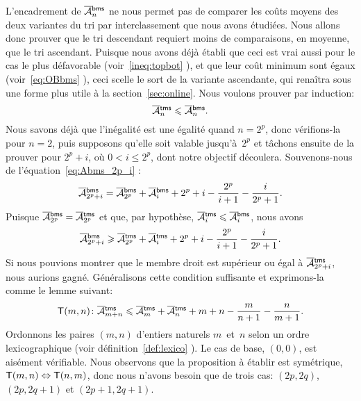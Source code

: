L'encadrement de \(\OM{\fun{bms}}{n}\) ne nous permet pas de comparer
les coûts moyens des deux variantes du tri par interclassement que
nous avons étudiées. Nous allons donc prouver que le tri descendant
requiert moins de comparaisons, en moyenne, que le tri
ascendant. Puisque nous avons déjà établi que ceci est vrai aussi pour
le cas le plus défavorable (voir~\eqref{ineq:topbot}
), et que leur coût minimum sont égaux
(voir~\eqref{eq:OBbms} ), ceci scelle le sort de la
variante ascendante, qui renaîtra sous une forme plus utile à la
section~\vref{sec:online}. Nous voulons prouver par induction:
\begin{equation*}
\OM{\fun{tms}}{n} \leqslant \OM{\fun{bms}}{n}.
\end{equation*}
Nous savons déjà que l'inégalité est une égalité quand \(n=2^p\), donc
vérifions-la pour \(n=2\), puis supposons qu'elle soit valable
jusqu'à~\(2^p\) et tâchons ensuite de la prouver pour \(2^p+i\), où
\(0 < i \leqslant 2^p\), dont notre objectif découlera. Souvenons-nous
de l'équation~\eqref{eq:Abms_2p_i} :
\begin{equation*}
\OM{\fun{bms}}{2^p+i} = \OM{\fun{bms}}{2^p} + \OM{\fun{bms}}{i}
+ 2^p + i - \frac{2^p}{i+1} - \frac{i}{2^p+1}.
\end{equation*}
Puisque \(\OM{\fun{bms}}{2^p} = \OM{\fun{tms}}{2^p}\) et que, par
hypothèse, \(\OM{\fun{tms}}{i} \leqslant \OM{\fun{bms}}{i}\), nous
avons
\begin{equation}
\OM{\fun{bms}}{2^p+i} \geqslant \OM{\fun{tms}}{2^p} + \OM{\fun{tms}}{i}
+ 2^p + i - \frac{2^p}{i+1} - \frac{i}{2^p+1}.
\label{ineq:Atms_Abms}
\end{equation}
Si nous pouvions montrer que le membre droit est supérieur ou égal à
\(\OM{\fun{tms}}{2^p+i}\), nous aurions gagné. Généralisons cette
condition suffisante et exprimons-la comme le lemme suivant:
\begin{equation*}
  \pred{T}{m,n} \colon
  \OM{\fun{tms}}{m+n} \leqslant \OM{\fun{tms}}{m} + \OM{\fun{tms}}{n} +
  m + n - \frac{m}{n+1} - \frac{n}{m+1}.
\end{equation*}
Ordonnons les paires \((m,n)\) d'entiers naturels \(m\)~et~\(n\) selon
un ordre lexicographique (voir définition~\eqref{def:lexico}
). Le cas de base, \((0,0)\), est aisément
vérifiable. Nous observons que la proposition à établir est
symétrique, \(\textsf{T}({m,n}) \Leftrightarrow \textsf{T}({n,m})\), donc nous
n'avons besoin que de trois cas: \((2p,2q)\), \((2p,2q+1)\) et
\((2p+1,2q+1)\).
